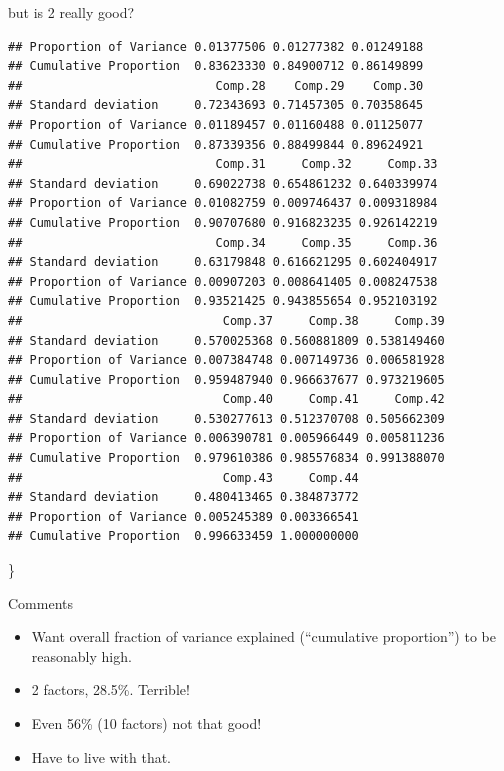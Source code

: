 \documentclass[ignorenonframetext,]{beamer}
\begin{document}
\begin{frame}[fragile]{but is 2 really good?}
\begin{verbatim}
## Proportion of Variance 0.01377506 0.01277382 0.01249188
## Cumulative Proportion  0.83623330 0.84900712 0.86149899
##                           Comp.28    Comp.29    Comp.30
## Standard deviation     0.72343693 0.71457305 0.70358645
## Proportion of Variance 0.01189457 0.01160488 0.01125077
## Cumulative Proportion  0.87339356 0.88499844 0.89624921
##                           Comp.31     Comp.32     Comp.33
## Standard deviation     0.69022738 0.654861232 0.640339974
## Proportion of Variance 0.01082759 0.009746437 0.009318984
## Cumulative Proportion  0.90707680 0.916823235 0.926142219
##                           Comp.34     Comp.35     Comp.36
## Standard deviation     0.63179848 0.616621295 0.602404917
## Proportion of Variance 0.00907203 0.008641405 0.008247538
## Cumulative Proportion  0.93521425 0.943855654 0.952103192
##                            Comp.37     Comp.38     Comp.39
## Standard deviation     0.570025368 0.560881809 0.538149460
## Proportion of Variance 0.007384748 0.007149736 0.006581928
## Cumulative Proportion  0.959487940 0.966637677 0.973219605
##                            Comp.40     Comp.41     Comp.42
## Standard deviation     0.530277613 0.512370708 0.505662309
## Proportion of Variance 0.006390781 0.005966449 0.005811236
## Cumulative Proportion  0.979610386 0.985576834 0.991388070
##                            Comp.43     Comp.44
## Standard deviation     0.480413465 0.384873772
## Proportion of Variance 0.005245389 0.003366541
## Cumulative Proportion  0.996633459 1.000000000
\end{verbatim}

\}

\end{frame}

\begin{frame}{Comments}
\protect\hypertarget{comments-31}{}

\begin{itemize}
\item
  Want overall fraction of variance explained (``cumulative
  proportion'') to be reasonably high.
\item
  2 factors, 28.5\%. Terrible!
\item
  Even 56\% (10 factors) not that good!
\item
  Have to live with that.
\end{itemize}

\end{frame}
\end{document}
